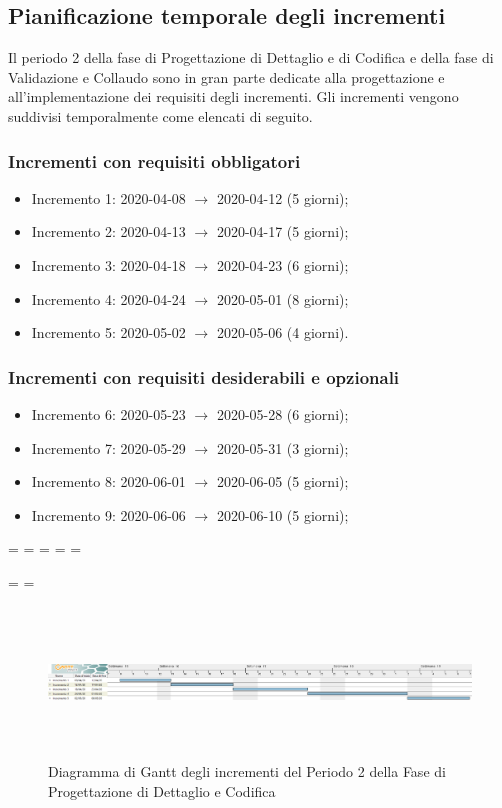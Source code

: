 \subsection{Pianificazione temporale degli incrementi}
Il periodo 2 della fase di Progettazione di Dettaglio e di Codifica e della fase di Validazione e Collaudo sono in gran parte dedicate alla progettazione e all'implementazione dei requisiti degli incrementi.
Gli incrementi vengono suddivisi temporalmente come elencati di seguito.

\subsubsection{Incrementi con requisiti obbligatori}
\begin{itemize}
	\item Incremento 1: 2020-04-08 $\rightarrow$ 2020-04-12 (5 giorni);
	\item Incremento 2: 2020-04-13 $\rightarrow$ 2020-04-17 (5 giorni);
	\item Incremento 3: 2020-04-18 $\rightarrow$ 2020-04-23 (6 giorni);
	\item Incremento 4: 2020-04-24 $\rightarrow$ 2020-05-01 (8 giorni);
	\item Incremento 5: 2020-05-02 $\rightarrow$ 2020-05-06 (4 giorni).
\end{itemize}

\subsubsection{Incrementi con requisiti desiderabili e opzionali}
\begin{itemize}
	\item Incremento 6: 2020-05-23 $\rightarrow$ 2020-05-28 (6 giorni);
	\item Incremento 7: 2020-05-29 $\rightarrow$ 2020-05-31 (3 giorni);
	\item Incremento 8: 2020-06-01 $\rightarrow$ 2020-06-05 (5 giorni);
	\item Incremento 9: 2020-06-06 $\rightarrow$ 2020-06-10 (5 giorni);
\end{itemize}

\newpage
\paperwidth=\pdfpageheight
\paperheight=\pdfpagewidth
\pdfpageheight=\paperheight
\pdfpagewidth=\paperwidth
\headwidth=\textheight

\begingroup 
\vsize=\textwidth
\hsize=\textheight

\pagestyle{empty}
\begin{figure}[h]
	\centering
	\includegraphics[height = 4cm, width = 24.5cm]{Sezioni/Immagini/DiagrammiGantt/PianificazioneTemporaleIncrementi.png}
	\caption{Diagramma di Gantt degli incrementi del Periodo 2 della Fase di Progettazione di Dettaglio e Codifica}
\end{figure}

